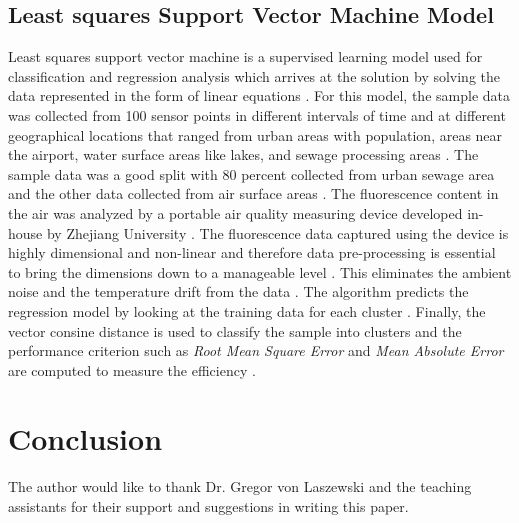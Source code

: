 \documentclass[sigconf]{acmart}
\begin{document}
\subsection{Least squares Support Vector Machine Model}
Least squares support vector machine is a supervised learning model used for classification and regression analysis which arrives at the solution by solving the data represented in the form of linear equations \cite{gagan2017}. For this model, the sample data was collected from 100 sensor points in different intervals of time and at different geographical locations that ranged from urban areas with population, areas near the airport, water surface areas like lakes, and sewage processing areas \cite{gagan2017}. The sample data was a good split with 80 percent collected from urban sewage area and the other data collected from air surface areas \cite{gagan2017}. The fluorescence content in the air was analyzed by a portable air quality measuring device developed in-house by Zhejiang University \cite{gagan2017}. The fluorescence data captured using the device is highly dimensional and non-linear and therefore data pre-processing is essential to bring the dimensions down to a manageable level \cite{gagan2017}. This eliminates the ambient noise and the temperature drift from the data \cite{gagan2017}. The algorithm predicts the regression model by looking at the training data for each cluster \cite{gagan2017}. Finally, the vector consine distance is used to classify the sample into clusters and the performance criterion such as {\em Root Mean Square Error}  and {\em Mean Absolute Error} are computed to measure the efficiency \cite{gagan2017}. 

\section{Conclusion}

    
\begin{acks}

The author would like to thank Dr. Gregor von Laszewski and the teaching assistants for their support and suggestions in writing this paper.

\end{acks}


 
\end{document}
